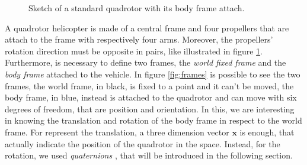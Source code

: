 \begin{figure}[h]
	\caption{Sketch of a standard quadrotor with its body frame attach.}
	\label{fig:quadrtotor}
\end{figure}

\noindent A quadrotor helicopter is made of a central frame and four propellers that are attach to the frame with respectively four arms. Moreover, the propellers' rotation direction must be opposite in pairs, like illustrated in figure \ref{fig:quadrtotor}. \newline
\noindent Furthermore, is necessary to define two frames, the \textit{world fixed frame} and the \textit{body frame} attached to the vehicle.
\noindent In figure \ref{fig:frames} is possible to see the two frames, the world frame, in black, is fixed to a point and it can't be moved, the body frame, in blue, instead is attached to the quadrotor and can move with six degrees of freedom, that are position and orientation. In this, we are interesting in knowing the translation and rotation of the body frame in respect to the world frame. For represent the translation, a three dimension vector $\mathbf{x}$ is enough, that actually indicate the position of the quadrotor in the space. Instead, for the rotation, we used \textit{quaternions} \cite{quaternion}, that will be introduced in the following section.

